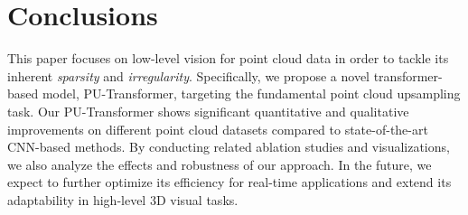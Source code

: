 \section{Conclusions}
\label{sec:concl}
This paper focuses on low-level vision for point cloud data in order to tackle its inherent \emph{sparsity} and \emph{irregularity}. Specifically, we propose a novel transformer-based model, PU-Transformer, targeting the fundamental point cloud upsampling task. Our PU-Transformer shows significant quantitative and qualitative improvements on different point cloud datasets compared to state-of-the-art CNN-based methods. By conducting related ablation studies and visualizations, we also analyze the effects and robustness of our approach. In the future, we expect to further optimize its efficiency for real-time applications and extend its adaptability in high-level 3D visual tasks.